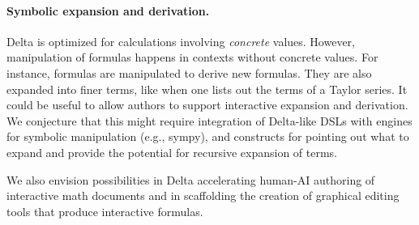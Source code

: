 \paragraph{Symbolic expansion and derivation.} Delta is optimized for calculations involving \emph{concrete} values. However, manipulation of formulas happens in contexts without concrete values. For instance, formulas are manipulated to derive new formulas. They are also expanded into finer terms, like when one lists out the terms of a Taylor series. It could be useful to allow authors to support interactive expansion and derivation. We conjecture that this might require integration of Delta-like DSLs with engines for symbolic manipulation (e.g., sympy), and constructs for pointing out what to expand and provide the potential for recursive expansion of terms.

\medskip

We also envision possibilities in Delta accelerating human-AI authoring of interactive math documents and in scaffolding the creation of graphical editing tools that produce interactive formulas.
